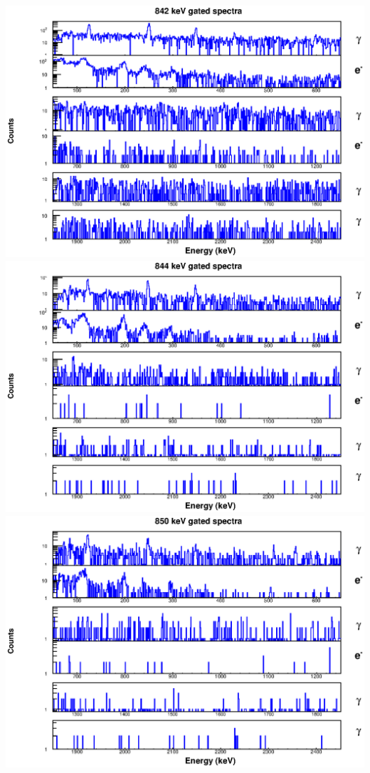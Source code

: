 \includegraphics[scale=0.8]{154Gd_Appendix/842_combined.eps}
\includegraphics[scale=0.8]{154Gd_Appendix/844_combined.eps}
\includegraphics[scale=0.8]{154Gd_Appendix/850_combined.eps}
